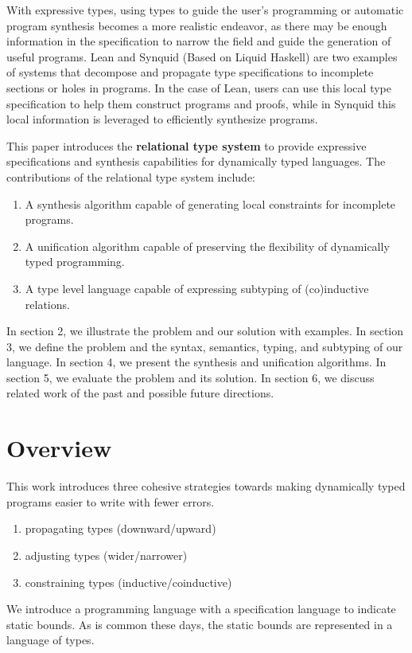 \documentclass[manuscript]{acmart}
\theoremstyle{definition}
\begin{document}
With expressive types, using types to guide the user's programming or automatic program synthesis 
becomes a more realistic endeavor, as there may be enough information in the specification to narrow the field
and guide the generation of useful programs. Lean and Synquid\cite{} (Based on Liquid Haskell) 
are two examples of systems that decompose and propagate type specifications 
to incomplete sections or holes in programs. 
In the case of Lean, users can use this local type specification to help them construct programs and proofs,
while in Synquid this local information is leveraged to efficiently synthesize programs. 

This paper introduces the \textbf{relational type system} to provide expressive specifications 
and synthesis capabilities for dynamically typed languages. 
The contributions of the relational type system include:
\begin{enumerate}
  \item A synthesis algorithm capable of generating local constraints for incomplete programs. 
  \item A unification algorithm capable of preserving the flexibility of dynamically typed programming. 
  \item A type level language capable of expressing subtyping of (co)inductive relations. 
\end{enumerate}



In section 2, we illustrate the problem and our solution with examples.
In section 3, we define the problem and the syntax, semantics, typing, and subtyping of our language.
In section 4, we present the synthesis and unification algorithms.
In section 5, we evaluate the problem and its solution. 
In section 6, we discuss related work of the past and possible future directions. 

\section{Overview}

This work introduces three cohesive strategies towards making
dynamically typed programs easier to write with fewer errors.  
\begin{enumerate}
  \item propagating types (downward/upward) 
  \item adjusting types (wider/narrower) 
  \item constraining types (inductive/coinductive) 
\end{enumerate}
We introduce a programming language with a specification language to indicate static bounds. 
As is common these days, the static bounds are represented in a language of types.
\end{document}
